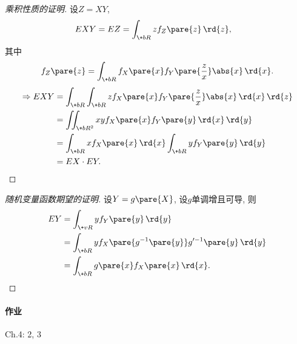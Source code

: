 \documentclass[../Statistics.tex]{subfiles}
\begin{document}
\begin{proof}[乘积性质的证明]
    设$Z = XY$,
    \begin{align*}
        EXY &= EZ = \int_{\+bR} zf_Z\pare{z}\,\rd{z},
    \end{align*}
    其中
    \[ f_Z\pare{z} = \int_{\+bR} f_X\pare{x} f_Y\pare{\frac{z}{x}}\abs{x}\,\rd{x}. \]
    \begin{align*}
        \Rightarrow EXY &= \int_{\+bR} \int_{\+bR} zf_X\pare{x} f_Y\pare{\frac{z}{x}}\abs{x}\,\rd{x}\,\rd{z} \\
        &= \iint_{\+bR^2} xyf_X\pare{x}f_Y\pare{y} \,\rd{x}\,\rd{y} \\
        &= \int_{\+bR} xf_X\pare{x}\,\rd{x} \int_{\+bR} yf_Y\pare{y}\,\rd{y} \\
        &= EX\cdot EY. \qedhere
    \end{align*}
\end{proof}
\begin{proof}[随机变量函数期望的证明]
    设$Y = g\pare{X}$, 设$g$单调增且可导, 则
    \begin{align*}
        EY &= \int_{\+vR} yf_Y\pare{y}\,\rd{y} \\
        &= \int_{\+bR} yf_X\pare{g^{-1}\pare{y}}g'^{-1}\pare{y}\,\rd{y} \\
        &= \int_{\+bR} g\pare{x} f_X\pare{x} \,\rd{x}. \qedhere
    \end{align*}
\end{proof}

\paragraph{作业} %
\label{par:作业}

Ch.4: 2, 3

\end{document}
